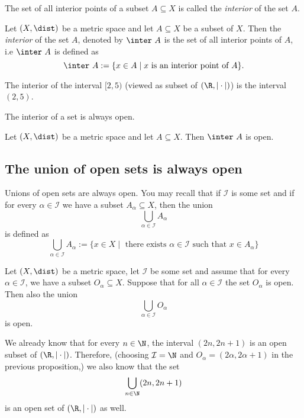 The set of all interior points of a subset $A \subseteq X$ is called the \emph{interior} of the set $A$.
\begin{definition}
    Let $(X,\dist)$ be a metric space and let $A \subseteq X$ be a subset of $X$. Then the \emph{interior} of the set $A$, denoted
    by $\inter\ A$ is the set of all interior points of $A$, i.e $\inter\ A$ is defined as
    $$\inter\ A := \{x \in A \mid x \text{ is an interior point of } A \}.$$
\end{definition}
\begin{example}
    The interior of the interval $[2,5)$ (viewed as subset of $(\R, |\cdot|)$) is the interval $(2,5)$.
\end{example}

The interior of a set is always open.
\begin{proposition}
    Let $(X, \dist)$ be a metric space and let $A \subseteq X$. Then $\inter\ A$ is open.
\end{proposition}

\subsection*{The union of open sets is always open}
Unions of open sets are always open. You may recall that if $\mathcal{I}$ is some set and if for every $\alpha \in \mathcal{I}$
we have a subset $A_\alpha \subseteq X$, then the union
$$\bigcup_{\alpha \in \mathcal{I}}A_\alpha$$
is defined as 
$$\bigcup_{\alpha \in \mathcal{I}}A_\alpha := \{x \in X \mid \text{ there exists } \alpha \in \mathcal{I} \text{ such that } x \in A_\alpha\}$$

\begin{proposition}
    Let $(X, \dist)$ be a metric space, let $\mathcal{I}$ be some set and assume that for every $\alpha \in \mathcal{I}$, we have a subset
    $O_\alpha \subseteq X$. Suppose that for all $\alpha \in \mathcal{I}$ the set $O_\alpha$ is open. Then also the union
    $$\bigcup_{\alpha \in \mathcal{I}}O_\alpha$$
    is open.
\end{proposition}
\begin{example}
    We already know that for every $n \in \N$, the interval $(2n, 2n+1)$ is an open subset of $(\R, |\cdot|)$. Therefore,
    (choosing $\mathcal{I} = \N$ and $O_\alpha = (2\alpha, 2\alpha+1)$ in the previous proposition,) we also know that the set
    $$\bigcup_{n\in\N}(2n,2n+1)$$
    is an open set of $(\R, |\cdot|)$ as well.
\end{example}


